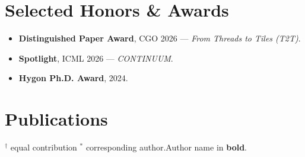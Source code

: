 \documentclass[11pt]{article}
\begin{document}
\section{Selected Honors \& Awards}
\begin{itemize}
  \item \textbf{Distinguished Paper Award}, CGO 2026 --- \emph{From Threads to Tiles (T2T)}.
  \item \textbf{Spotlight}, ICML 2026 --- \emph{CONTINUUM}.
  \item \textbf{Hygon Ph.D. Award}, 2024.
\end{itemize}

\section{Publications}
{\small $^{\dagger}$ equal contribution \quad $^{*}$ corresponding author.\quad Author name in \textbf{bold}.}
\vspace{0.4ex}
\end{document}
